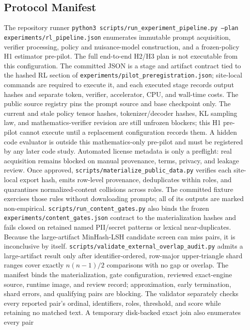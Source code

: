 \documentclass{article}
\begin{document}
\subsection{Protocol Manifest}
The repository runner
\texttt{python3 scripts/run\_experiment\_pipeline.py
--plan experiments/rl\_pipeline.json} enumerates immutable prompt acquisition,
verifier processing, policy and nuisance-model construction, and a frozen-policy
H1 estimator pre-pilot. The full end-to-end H2/H3 plan is not executable from
this configuration. The committed JSON is a
stage and artifact contract tied to the hashed RL section of
\texttt{experiments/pilot\_preregistration.json}; site-local commands are
required to execute it, and each executed stage records output hashes and
separate token, verifier, accelerator, CPU, and wall-time costs. The public
source registry pins the prompt source and base checkpoint only. The current
and stale policy tensor hashes, tokenizer/decoder hashes, KL sampling law, and
mathematics-verifier revision are still unfrozen blockers; this H1 pre-pilot
cannot execute until a replacement configuration records them. A hidden code
evaluator is outside this mathematics-only pre-pilot and must be registered by
any later code study.
Automated license metadata is only a preflight: real acquisition remains
blocked on manual provenance, terms, privacy, and leakage review.
Once approved, \texttt{scripts/materialize\_public\_data.py} verifies each
site-local export hash, emits row-level provenance, deduplicates within roles,
and quarantines normalized-content collisions across roles. The committed
fixture exercises those rules without downloading prompts; all of its outputs
are marked non-empirical.
\texttt{scripts/run\_content\_gates.py} also binds the frozen
\texttt{experiments/content\_gates.json} contract to the materialization hashes
and fails closed on retained named PII/secret patterns or lexical
near-duplicates. Because the large-artifact MinHash-LSH candidate screen can
miss pairs, it is inconclusive by itself.
\texttt{scripts/validate\_external\_overlap\_audit.py} admits a large-artifact
result only after identifier-ordered, row-major upper-triangle shard ranges
cover exactly $n(n-1)/2$ comparisons with no gap or overlap. The manifest binds
the materialization, gate configuration, reviewed exact-engine source, runtime
image, and review record; approximation, early termination, shard errors, and
qualifying pairs are blocking. The validator separately checks every reported
pair's ordinal, identifiers, roles, threshold, and score while retaining no
matched text. A temporary disk-backed exact join also enumerates every pair
\end{document}
